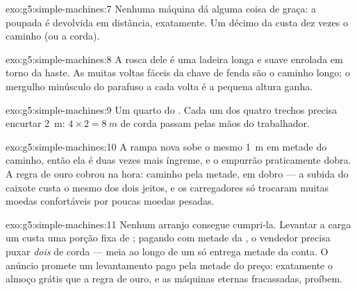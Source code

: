\begin{solution}{exo:g5:simple-machines:7}
Nenhuma máquina dá alguma coisa de graça: a  poupada é devolvida
em distância, exatamente. Um décimo da  custa dez vezes o
caminho (ou a corda).
\end{solution}

\begin{solution}{exo:g5:simple-machines:8}
A rosca dele é uma ladeira longa e suave enrolada em torno da haste.
As muitas voltas fáceis da chave de fenda são o caminho longo; o
mergulho minúsculo do parafuso a cada volta é a pequena altura
ganha.
\end{solution}

\begin{solution}{exo:g5:simple-machines:9}
Um quarto do . Cada um dos quatro trechos precisa encurtar
\qty{2}{m}: $4 \times 2 = \qty{8}{m}$ de corda passam pelas mãos do
trabalhador.
\end{solution}

\begin{solution}{exo:g5:simple-machines:10}
A rampa nova sobe o mesmo \qty{1}{m} em metade do caminho, então ela
é duas vezes mais íngreme, e o empurrão praticamente dobra. A regra
de ouro cobrou na hora: caminho pela metade,  em dobro --- a
subida do caixote custa o mesmo dos dois jeitos, e os carregadores só
trocaram muitas moedas confortáveis por poucas moedas pesadas.
\end{solution}

\begin{solution}{exo:g5:simple-machines:11}
Nenhum arranjo consegue cumpri-la. Levantar a carga um  custa
uma porção fixa de ; pagando com metade da , o vendedor
precisa puxar \emph{dois}  de corda --- meia  ao longo de
um  só entrega metade da conta. O anúncio promete um
levantamento pago pela metade do preço: exatamente o almoço grátis
que a regra de ouro, e as máquinas eternas fracassadas, proíbem.
\end{solution}
